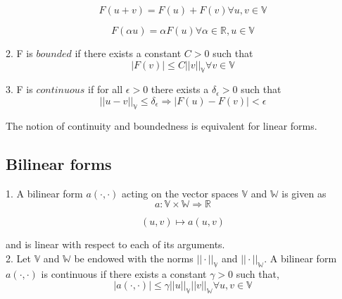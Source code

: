 \documentclass[a4paper,12pt]{book}
\begin{document}
\begin{equation} 
F(u+v) = F(u) + F(v) \forall u,v \in \mathbb{V} 
\end{equation}

\begin{equation} 
F(\alpha u) = \alpha F(u) \forall \alpha \in \mathbb{R}, u \in \mathbb{V}
\end{equation}

2. F is $bounded$ if there exists a constant $C > 0$ such that\\ 
\begin{equation} 
|F(v)| \leq C ||v||_\mathbb{V} \forall v \in \mathbb{V}
\end{equation}

3. F is $continuous$ if for all $\epsilon > 0$ there exists a $\delta_\epsilon > 0$ such that \\
\begin{equation}
||u - v||_\mathbb{V} \leq \delta_\epsilon \Rightarrow  |F(u) - F(v)| < \epsilon
\end{equation}

The notion of continuity and boundedness is equivalent for linear forms.

\subsection{Bilinear forms}

1. A bilinear form $a(\cdot,\cdot)$ acting on the vector spaces $\mathbb{V}$ and $\mathbb{W}$ is given as\\
\begin{equation}
a : \mathbb{V} \times \mathbb{W} \Rightarrow \mathbb{R}
\end{equation}

\begin{equation}
(u,v) \mapsto a(u,v)
\end{equation}

and is linear with respect to each of its arguments.\\

2. Let $\mathbb{V}$ and $\mathbb{W}$ be endowed with the norms $||\cdot||_\mathbb{V}$ and $||\cdot||_\mathbb{W}$. A bilinear form $a(\cdot,\cdot)$ is continuous if there exists a constant $\gamma > 0$ such that,\\
\begin{equation}
|a(\cdot,\cdot)| \leq \gamma ||u||_\mathbb{V} ||v||_\mathbb{W} \forall u,v \in \mathbb{V}
\end{equation}
\end{document}
